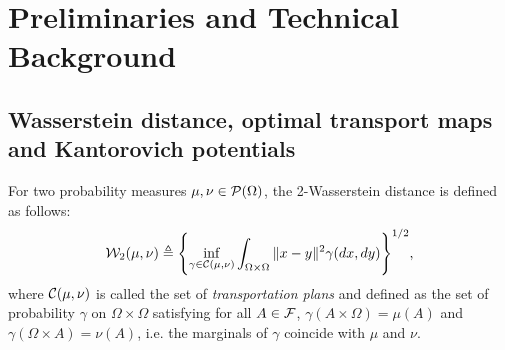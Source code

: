 
\section{Preliminaries and Technical Background}
\label{sec:techbg}




\subsection{Wasserstein distance, optimal transport maps and Kantorovich potentials}


For two probability measures $\mu,\nu \in {\cal P}(\Omega)$, the 2-Wasserstein distance is defined as follows:
\begin{align}
{\cal W}_2(\mu,\nu) \triangleq \Biggl\{ \inf_{\gamma \in {\cal C}(\mu,\nu)} \int_{\Omega \times \Omega} \|x-y\|^2 \gamma(dx , dy) \Biggr\}^{1/2}, \label{eqn:w2}
\end{align}
where ${\cal C}(\mu,\nu)$ is called the set of \emph{transportation plans} and defined as the set of probability $\gamma$ on $\Omega \times \Omega$ satisfying for all $A \in \mathcal{F}$, $\gamma(A \times \Omega) = \mu(A)$ and $\gamma(\Omega \times A)=\nu(A)$, i.e. the  marginals of $\gamma$  coincide with $\mu$ and $\nu$.


